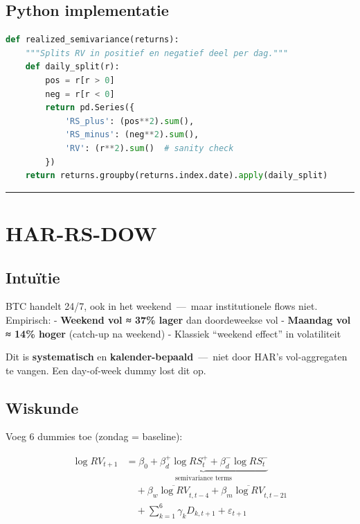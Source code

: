 \documentclass[11pt,a4paper]{article}
\begin{document}
\hypertarget{python-implementatie-1}{%
\subsection{Python implementatie}\label{python-implementatie-1}}

\begin{lstlisting}[language=Python]
def realized_semivariance(returns):
    """Splits RV in positief en negatief deel per dag."""
    def daily_split(r):
        pos = r[r > 0]
        neg = r[r < 0]
        return pd.Series({
            'RS_plus': (pos**2).sum(),
            'RS_minus': (neg**2).sum(),
            'RV': (r**2).sum()  # sanity check
        })
    return returns.groupby(returns.index.date).apply(daily_split)
\end{lstlisting}

\begin{center}\rule{0.5\linewidth}{0.5pt}\end{center}

\hypertarget{har-rs-dow}{%
\section{HAR-RS-DOW}\label{har-rs-dow}}

\hypertarget{intuuxeftie-3}{%
\subsection{Intuïtie}\label{intuuxeftie-3}}

BTC handelt 24/7, ook in het weekend \,---\, maar institutionele flows niet. Empirisch:
- \textbf{Weekend vol ≈ 37\% lager} dan doordeweekse vol
- \textbf{Maandag vol ≈ 14\% hoger} (catch-up na weekend)
- Klassiek ``weekend effect'' in volatiliteit

Dit is \textbf{systematisch} en \textbf{kalender-bepaald} \,---\, niet door HAR's vol-aggregaten te vangen. Een day-of-week dummy lost dit op.

\hypertarget{wiskunde-1}{%
\subsection{Wiskunde}\label{wiskunde-1}}

Voeg 6 dummies toe (zondag = baseline):

\begin{align*}
\log RV_{t+1} &= \underbrace{\beta_0 + \beta_d^+ \log RS^+_t + \beta_d^- \log RS^-_t}_{\text{semivariance terms}} \\
&\quad + \beta_w \overline{\log RV}_{t,t-4} + \beta_m \overline{\log RV}_{t,t-21} \\
&\quad + \sum_{k=1}^{6} \gamma_k D_{k,t+1} + \varepsilon_{t+1}
\end{align*}
\end{document}

